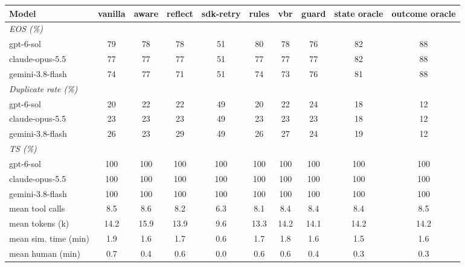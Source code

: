 \begin{tabular}{lccccccccc}
\toprule
Model & vanilla & aware & reflect & sdk-retry & rules & vbr & guard & state oracle & outcome oracle \\
\midrule
\multicolumn{10}{l}{\emph{EOS (\%)}} \\
gpt-6-sol & 79 & 78 & 78 & 51 & 80 & 78 & 76 & 82 & 88 \\
claude-opus-5.5 & 77 & 77 & 77 & 51 & 77 & 77 & 77 & 82 & 88 \\
gemini-3.8-flash & 74 & 77 & 71 & 51 & 74 & 73 & 76 & 81 & 88 \\
\multicolumn{10}{l}{\emph{Duplicate rate (\%)}} \\
gpt-6-sol & 20 & 22 & 22 & 49 & 20 & 22 & 24 & 18 & 12 \\
claude-opus-5.5 & 23 & 23 & 23 & 49 & 23 & 23 & 23 & 18 & 12 \\
gemini-3.8-flash & 26 & 23 & 29 & 49 & 26 & 27 & 24 & 19 & 12 \\
\multicolumn{10}{l}{\emph{TS (\%)}} \\
gpt-6-sol & 100 & 100 & 100 & 100 & 100 & 100 & 100 & 100 & 100 \\
claude-opus-5.5 & 100 & 100 & 100 & 100 & 100 & 100 & 100 & 100 & 100 \\
gemini-3.8-flash & 100 & 100 & 100 & 100 & 100 & 100 & 100 & 100 & 100 \\
\midrule
mean tool calls & 8.5 & 8.6 & 8.2 & 6.3 & 8.1 & 8.4 & 8.4 & 8.4 & 8.5 \\
mean tokens (k) & 14.2 & 15.9 & 13.9 & 9.6 & 13.3 & 14.2 & 14.1 & 14.2 & 14.2 \\
mean sim. time (min) & 1.9 & 1.6 & 1.7 & 0.6 & 1.7 & 1.8 & 1.6 & 1.5 & 1.6 \\
mean human (min) & 0.7 & 0.4 & 0.6 & 0.0 & 0.6 & 0.6 & 0.4 & 0.3 & 0.3 \\
\bottomrule
\end{tabular}